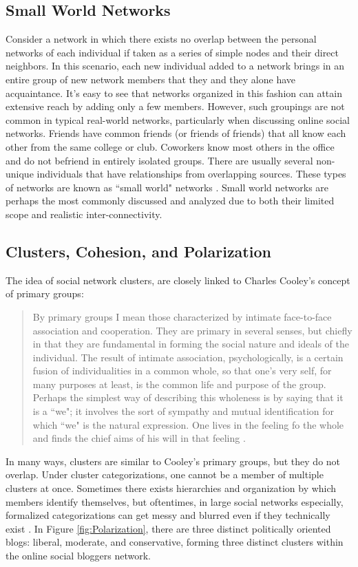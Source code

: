 {\subsection{Small World Networks}
Consider a network in which there exists no overlap between the personal networks of each individual if taken as a series of simple nodes and their direct neighbors. In this scenario, each new individual added to a network brings in an entire group of new network members that they and they alone have acquaintance. It's easy to see that networks organized in this fashion can attain extensive reach by adding only a few members. However, such groupings are not common in typical real-world networks, particularly when discussing online social networks. Friends have common friends (or friends of friends) that all know each other from the same college or club. Coworkers know most others in the office and do not befriend in entirely isolated groups. There are usually several non-unique individuals that have relationships from overlapping sources. These types of networks are known as ``small world" networks \cite{watts1998collective}. Small world networks are perhaps the most commonly discussed and analyzed due to both their limited scope and realistic inter-connectivity.

\subsection{Clusters, Cohesion, and Polarization}
The idea of social network clusters, are closely linked to Charles Cooley's concept of primary groups:
\begin{quote}
By primary groups I mean those characterized by intimate face-to-face association and cooperation. They are primary in several senses, but chiefly in that they are fundamental in forming the social nature and ideals of the individual. The result of intimate association, psychologically, is a certain fusion of individualities in a common whole, so that one's very self, for many purposes at least, is the common life and purpose of the group. Perhaps the simplest way of describing this wholeness is by saying that it is a ``we"; it involves the sort of sympathy and mutual identification for which ``we" is the natural expression. One lives in the feeling fo the whole and finds the chief aims of his will in that feeling \cite{cooley1909social}.
\end{quote}

\noindent In many ways, clusters are similar to Cooley's primary groups, but they do not overlap. Under cluster categorizations, one cannot be a member of multiple clusters at once. Sometimes there exists hierarchies and organization by which members identify themselves, but oftentimes, in large social networks especially, formalized categorizations can get messy and blurred even if they technically exist \cite{kadushin2012understanding}. In Figure \ref{fig:Polarization}, there are three distinct politically oriented blogs: liberal, moderate, and conservative, forming three distinct clusters within the online social bloggers network.

}
